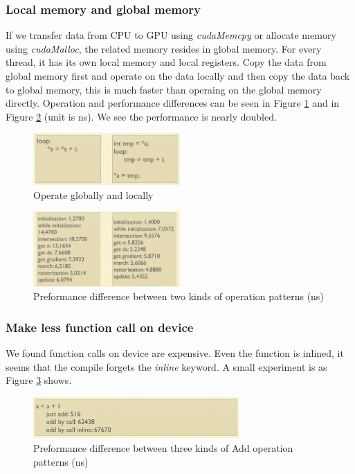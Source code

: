 \documentclass[a4paper]{article}
\begin{document}
\begin{CJK*}{UTF8}{gkai}
\subsubsection{Local memory and global memory}
If we transfer data from CPU to GPU using \textit{cudaMemcpy} or allocate memory using \textit{cudaMalloc}, the related memory resides in global memory. For every thread, it has its own local memory and local registers. Copy the data from global memory first and operate on the data locally and then copy the data back to global memory, this is much faster than operaing on the global memory directly. Operation and performance differences can be seen in Figure \ref{fig:gandl} and in Figure \ref{fig:gandlperf} (unit is ns). We see the performance is nearly doubled.


\begin{figure}[H]
\centering
\includegraphics[width=0.5\textwidth]{gandl.png}
\caption{\label{fig:gandl}Operate globally and locally}
\end{figure}


\begin{figure}[H]
\centering
\includegraphics[width=0.5\textwidth]{gandlperf.png}
\caption{\label{fig:gandlperf}Preformance difference between two kinds of operation patterns (ns)}
\end{figure}

\subsubsection{Make less function call on device}
We found function calls on device are expensive. Even the function is inlined, it seems that the compile forgets the \textit{inline} keyword. A small experiment is as Figure \ref{fig:funccall} shows.

\begin{figure}[H]
\centering
\includegraphics[width=0.7\textwidth]{funccall.png}
\caption{\label{fig:funccall}Preformance difference between three kinds of Add operation patterns (ns)}
\end{figure}


\end{CJK*}
\end{document}
